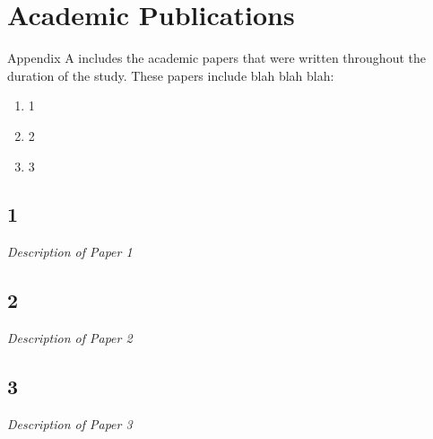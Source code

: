 \chapter{Academic Publications}
\begin{tcolorbox}
Appendix A includes the academic papers that were written throughout the duration of the study. These papers include blah blah blah:
\begin{enumerate}
	\item 1  
	\item 2
	\item 3
\end{enumerate}
\end{tcolorbox}

\section{1}
\label{apen:1}
\begin{tcolorbox}
	\emph{Description of Paper 1}
\end{tcolorbox}



\section{2}
\label{apen:2}
\begin{tcolorbox}
	\emph{Description of Paper 2}
\end{tcolorbox}



\section{3}
\label{apen:3}
\begin{tcolorbox}
	\emph{Description of Paper 3}
\end{tcolorbox}

